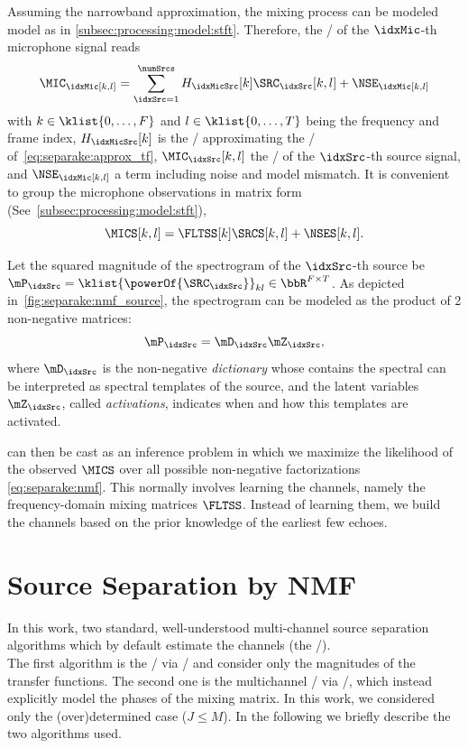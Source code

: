 \mynewline
Assuming the narrowband approximation, the mixing process can be modeled model as in \cref{subsec:processing:model:stft}.
Therefore, the \STFTdef/ of the $\idxMic$-th microphone signal reads
\begin{equation}
    \label{eq:separake:stft}
    \MIC_\idxMic[k,l] = \sum_{\idxSrc = 1}^{\numSrcs} H_{\idxMicSrc}[k] \SRC_{\idxSrc}[k,l] + \NSE_\idxMic[k,l]
\end{equation}
with $k\in\klist{0,\ldots,F}$ and $l\in\klist{0,\ldots,T}$ being the frequency and frame index,
$H_{\idxMicSrc}[k]$ is the \DFT/ approximating the \RTF/ of~\eqref{eq:separake:approx_tf},
$\MIC_{\idxSrc}[k,l]$ the \STFT/ of the $\idxSrc$-th source signal, and $\NSE_\idxMic[k,l]$ a term including noise and model mismatch.
It is convenient to group the microphone observations in matrix form (See~\cref{subsec:processing:model:stft}),
\begin{equation}
    \MICS[k,l] = \FLTSS[k]\SRCS[k,l] + \NSES[k,l]
    .
\end{equation}

\mynewline
Let the squared magnitude of the spectrogram of the $\idxSrc$-th source be $\mP_\idxSrc = \klist{\powerOf{\SRC_\idxSrc}}_{kl} \in \bbR^{F\times T}$.
As depicted in~\cref{fig:separake:nmf_source}, the spectrogram can be modeled as the product of 2 non-negative matrices:
\begin{equation}
    \label{eq:separake:nmf}
    \mP_\idxSrc =  \mD_\idxSrc \mZ_\idxSrc,
\end{equation}
where $\mD_\idxSrc$ is the non-negative \textit{dictionary} whose contains the spectral can be interpreted as spectral templates of the source,
and the latent variables $\mZ_\idxSrc$, called \textit{activations}, indicates when and how this templates are activated.

 can then be cast as an inference problem in which we maximize the likelihood of the observed $\MICS$ over all possible non-negative factorizations \eqref{eq:separake:nmf}.
This normally involves learning the channels, namely the frequency-domain mixing matrices $\FLTSS$.
Instead of learning them, we build the channels based on the prior knowledge of the earliest few echoes.

\section{Source Separation by NMF}
In this work, two standard, well-understood multi-channel source separation algorithms which by default estimate the channels (the \RTFs/).
\\The first algorithm is the \NMFdef/ via \MUdef/ and consider only the magnitudes of the transfer functions.
The second one is the multichannel \NMF/ via \EMdef/, which instead explicitly model the phases of the mixing matrix.
In this work, we considered only the (over)determined case ($J \leq M$).
In the following we briefly describe the two algorithms used.

